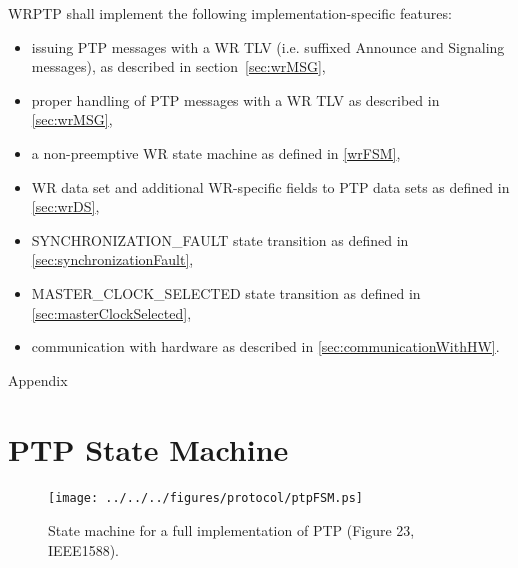 \documentclass[a4paper, 12pt]{article}
\begin{document}
WRPTP shall implement the following implementation-specific features:
\begin{itemize}
  \item issuing PTP messages with a WR TLV (i.e. suffixed Announce and Signaling messages),
	as described in section~\ref{sec:wrMSG},
  \item proper handling of PTP messages with a WR TLV as described in \ref{sec:wrMSG},
  \item a non-preemptive WR state machine as defined in \ref{wrFSM},
  \item WR data set and additional WR-specific fields to PTP data sets as defined in 
	\ref{sec:wrDS},
  \item SYNCHRONIZATION\_FAULT state transition as defined in \ref{sec:synchronizationFault},
  \item MASTER\_CLOCK\_SELECTED state transition as defined in \ref{sec:masterClockSelected},
  \item communication with hardware as described in \ref{sec:communicationWithHW}.
\end{itemize}


\newpage
\begin{center}
\huge Appendix
\end{center} 

\normalsize
\appendix
\section{PTP State Machine}
\label{ptpFSM}

 \begin{figure}[ht!]
   \centering
   \texttt{[image: ../../../figures/protocol/ptpFSM.ps]}
   \caption{State machine for a full implementation of PTP (Figure 23, IEEE1588).}
   \label{fig:ptpFSM}
 \end{figure}
 
 \newpage
\end{document}
